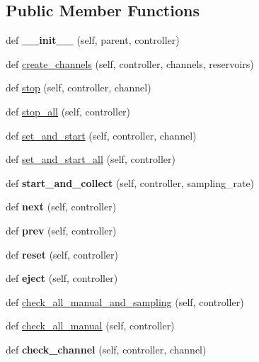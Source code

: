 \subsection*{Public Member Functions}
\begin{DoxyCompactItemize}
\item 
\mbox{\label{class_g_u_i_1_1_manual_page_a2734204da1ed4dacc54d8b6d2b8a71e3}} 
def {\bfseries \+\_\+\+\_\+init\+\_\+\+\_\+} (self, parent, controller)
\item 
def \mbox{\hyperlink{class_g_u_i_1_1_manual_page_adaf2d13de11696b3803b541dfcc47f61}{create\+\_\+channels}} (self, controller, channels, reservoirs)
\item 
def \mbox{\hyperlink{class_g_u_i_1_1_manual_page_a14d88e9b478d9bb8828c0639dd258d1e}{stop}} (self, controller, channel)
\item 
def \mbox{\hyperlink{class_g_u_i_1_1_manual_page_a6e9cb2efbec0918bb12f6bc9f26fbfde}{stop\+\_\+all}} (self, controller)
\item 
def \mbox{\hyperlink{class_g_u_i_1_1_manual_page_af00991d5107b8b590f222c7c5a82c8d9}{set\+\_\+and\+\_\+start}} (self, controller, channel)
\item 
def \mbox{\hyperlink{class_g_u_i_1_1_manual_page_a9c7c4c6f8b8811f2c88841419faa2cc2}{set\+\_\+and\+\_\+start\+\_\+all}} (self, controller)
\item 
\mbox{\label{class_g_u_i_1_1_manual_page_afa50301e19523a6a4151c2c2c6d9a969}} 
def {\bfseries start\+\_\+and\+\_\+collect} (self, controller, sampling\+\_\+rate)
\item 
\mbox{\label{class_g_u_i_1_1_manual_page_a3edbdcd63e5dcb8fc7e1c9b21110206e}} 
def {\bfseries next} (self, controller)
\item 
\mbox{\label{class_g_u_i_1_1_manual_page_a03fe8089188d5fd8ccc6f8a26a516383}} 
def {\bfseries prev} (self, controller)
\item 
\mbox{\label{class_g_u_i_1_1_manual_page_a1b062258c6e05d3477ebcf94d5deff3b}} 
def {\bfseries reset} (self, controller)
\item 
\mbox{\label{class_g_u_i_1_1_manual_page_a9c014c2c40c5a160ecb3e0329fa289ea}} 
def {\bfseries eject} (self, controller)
\item 
def \mbox{\hyperlink{class_g_u_i_1_1_manual_page_a4c34ad73eebd301c4981a02cf4e56daa}{check\+\_\+all\+\_\+manual\+\_\+and\+\_\+sampling}} (self, controller)
\item 
def \mbox{\hyperlink{class_g_u_i_1_1_manual_page_aa7967ed411dd9846fd92f65b494972cf}{check\+\_\+all\+\_\+manual}} (self, controller)
\item 
\mbox{\label{class_g_u_i_1_1_manual_page_a68aaed68e1efc88cfcf68a0830036166}} 
def {\bfseries check\+\_\+channel} (self, controller, channel)
\end{DoxyCompactItemize}
